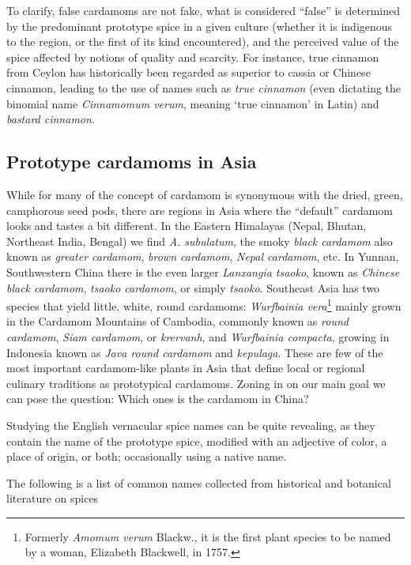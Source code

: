 \documentclass[12pt]{article}
\begin{document}
To clarify, false cardamoms are not fake, what is considered ``false'' is determined by the predominant prototype spice in a given culture (whether it is indigenous to the region, or the first of its kind encountered), and the perceived value of the spice affected by notions of quality and scarcity. For instance, true cinnamon from Ceylon has historically been regarded as superior to cassia or Chinese cinnamon, leading to the use of names such as \textit{true cinnamon} (even dictating the binomial name \textit{Cinnamomum verum}, meaning `true cinnamon' in Latin) and \textit{bastard cinnamon}.

\subsection{Prototype cardamoms in Asia}

While for many of the concept of cardamom is synonymous with the dried, green, camphorous seed pods, there are regions in Asia where the ``default'' cardamom looks and tastes a bit different. In the Eastern Himalayas (Nepal, Bhutan, Northeast India, Bengal) we find \textit{A. subulatum}, the smoky \textit{black cardamom} also known as  \textit{greater cardamom}, \textit{brown cardamom}, \textit{Nepal cardamom}, etc. In Yunnan, Southwestern China there is the even larger \textit{Lanxangia tsaoko}, known as \textit{Chinese black cardamom}, \textit{tsaoko cardamom}, or simply \textit{tsaoko}. Southeast Asia has two species that yield little, white, round cardamoms: \textit{Wurfbainia vera}\footnote{Formerly \textit{Amomum verum} Blackw., it is the first plant species to be named by a woman, Elizabeth Blackwell, in 1757.} mainly grown in the Cardamom Mountains of Cambodia, commonly known as \textit{round cardamom}, \textit{Siam cardamom}, or \textit{krervanh}, and \textit{Wurfbainia compacta}, growing in Indonesia known as \textit{Java round cardamom} and \textit{kepulaga}. These are few of the most important cardamom-like plants in Asia that define local or regional culinary traditions as prototypical cardamoms. Zoning in on our main goal we can pose the question: Which ones is the cardamom in China?

Studying the English vernacular spice names can be quite revealing, as they contain the name of the prototype spice, modified with an adjective of color, a place of origin, or both; occasionally using a native name.

The following is a list of common names collected from historical and botanical literature on spices 
\end{document}
